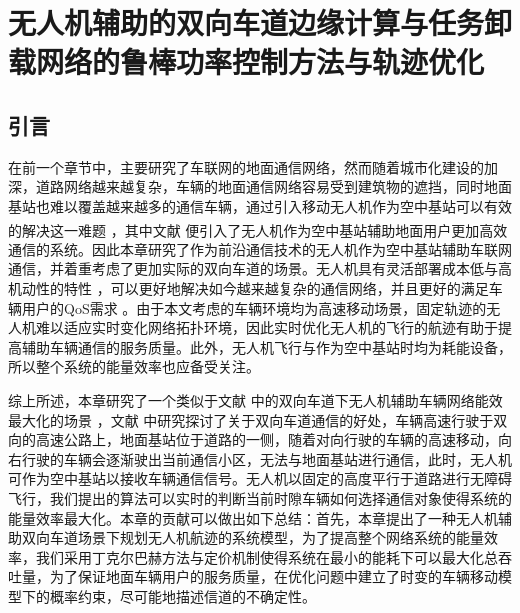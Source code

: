 \chapter{无人机辅助的双向车道边缘计算与任务卸载网络的鲁棒功率控制方法与轨迹优化}

\label{chap:table}
\section{引言}\label{section4-1}
\label{chap:introduction}
在前一个章节中，主要研究了车联网的地面通信网络，然而随着城市化建设的加深，道路网络越来越复杂，车辆的地面通信网络容易受到建筑物的遮挡，同时地面基站也难以覆盖越来越多的通信车辆，通过引入移动无人机作为空中基站可以有效的解决这一难题  \textsuperscript{\cite{Effect2020,Performance2022}}，其中文献 \cite{WirelessRelay5937283} 便引入了无人机作为空中基站辅助地面用户更加高效通信的系统。因此本章研究了作为前沿通信技术的无人机作为空中基站辅助车联网通信，并着重考虑了更加实际的双向车道的场景。无人机具有灵活部署成本低与高机动性的特性  \cite{无人机技术辅助的车联网,王智煊2023无人机辅助下的车联边缘计算卸载机制研究,Joint9453853}，可以更好地解决如今越来越复杂的通信网络，并且更好的满足车辆用户的QoS需求 \cite{无人机QoS9373692}。由于本文考虑的车辆环境均为高速移动场景，固定轨迹的无人机难以适应实时变化网络拓扑环境，因此实时优化无人机的飞行的航迹有助于提高辅助车辆通信的服务质量。此外，无人机飞行与作为空中基站时均为耗能设备，所以整个系统的能量效率也应备受关注。

综上所述，本章研究了一个类似于文献 \cite{twoway7091030}中的双向车道下无人机辅助车辆网络能效最大化的场景 ，文献 \cite{twoway5753961,twoway575396233,Spatial4490168,Stochastic6576809}中研究探讨了关于双向车道通信的好处，车辆高速行驶于双向的高速公路上，地面基站位于道路的一侧，随着对向行驶的车辆的高速移动，向右行驶的车辆会逐渐驶出当前通信小区，无法与地面基站进行通信，此时，无人机可作为空中基站以接收车辆通信信号。无人机以固定的高度平行于道路进行无障碍飞行，我们提出的算法可以实时的判断当前时隙车辆如何选择通信对象使得系统的能量效率最大化。本章的贡献可以做出如下总结：首先，本章提出了一种无人机辅助双向车道场景下规划无人机航迹的系统模型，为了提高整个网络系统的能量效率，我们采用丁克尔巴赫方法与定价机制使得系统在最小的能耗下可以最大化总吞吐量，为了保证地面车辆用户的服务质量，在优化问题中建立了时变的车辆移动模型下的概率约束，尽可能地描述信道的不确定性。
